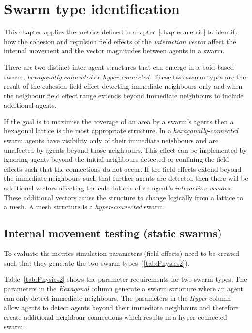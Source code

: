 \chapter{Swarm type identification}\label{chapter:SwarmType}
This chapter applies the metrics defined in chapter~\ref{chapter:metric} to identify how the cohesion and repulsion field effects of the \textit{interaction vector} affect the internal movement and the vector magnitudes between agents in a swarm. 

There are two distinct inter-agent structures that can emerge in a boid-based swarm, \textit{hexagonally-connected} or \textit{hyper-connected}. These two swarm types are the result of the cohesion field effect detecting immediate neighbours only and when the neighbour field effect range extends beyond immediate neighbours to include additional agents. 

If the goal is to maximise the coverage of an area by a swarm's agents then a hexagonal lattice is the most appropriate structure. In a \textit{hexagonally-connected} swarm agents have visibility only of their immediate neighbours and are unaffected by agents beyond those neighbours. This effect can be implemented by ignoring agents beyond the initial neighbours detected or confining the field effects such that the connections do not occur. If the field effects extend beyond the immediate neighbours such that further agents are detected then there will be additional vectors affecting the calculations of an agent's \textit{interaction vectors}. These additional vectors cause the structure to change logically from a lattice to a mesh. A mesh structure is a \textit{hyper-connected} swarm.

\section{Internal movement testing (static swarms)}\label{Section:StabilityTesting}
To evaluate the metrics simulation parameters (field effects) need to be created such that they generate the two swarm types~(\autoref{tab:Physics2}).

Table~\ref{tab:Physics2} shows the parameter requirements for two swarm types. The parameters in the \textit{Hexagonal} column generate a swarm structure where an agent can only detect immediate neighbours. The parameters in the \textit{Hyper} column allow agents to detect agents beyond their immediate neighbours and therefore create additional neighbour connections which results in a hyper-connected swarm.

